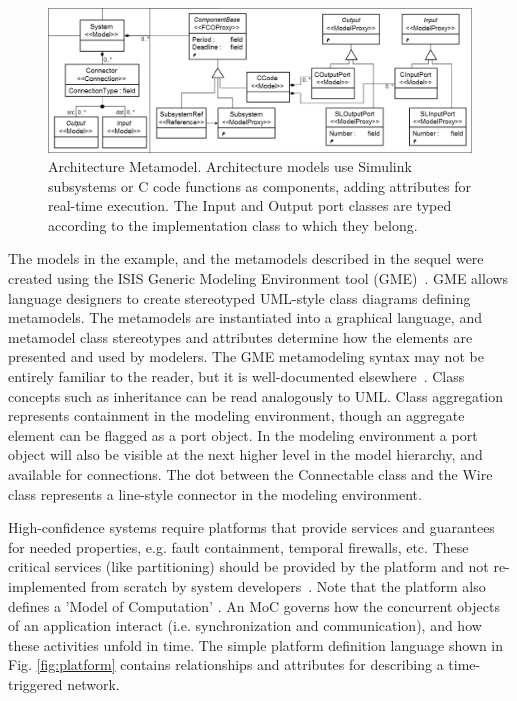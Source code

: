 \begin{figure}
	\centering
	\includegraphics[width=0.9\columnwidth]{diagrams/arch_lang.png}
	\caption{Architecture Metamodel. Architecture models use Simulink subsystems or C code functions as components, adding attributes for real-time execution. The Input and Output port classes are typed according to the implementation class to which they belong.}
	\label{fig:arch}
\end{figure}

The models in the example, and the metamodels described in the sequel were created using the ISIS Generic Modeling Environment tool (GME)~\cite{isis:gme}.  GME allows language designers to create stereotyped UML-style class diagrams defining metamodels.  The metamodels are instantiated into a graphical language, and metamodel class stereotypes and attributes determine how the elements are presented and used by modelers.  The GME metamodeling syntax may not be entirely familiar to the reader, but it is well-documented elsewhere~\cite{karsai:mic}. Class concepts such as inheritance can be read analogously to UML.  Class aggregation represents containment in the modeling environment, though an aggregate element can be flagged as a port object.  In the modeling environment a port object will also be visible at the next higher level in the model hierarchy, and available for connections.  The dot between the Connectable class and the Wire class represents a line-style connector in the modeling environment.

High-confidence systems require platforms that provide services and guarantees for needed properties, e.g. fault containment, temporal firewalls, etc. These critical services (like partitioning) should be provided by the platform and not re-implemented from scratch by system developers~\cite{alberto:2002}.  Note that the platform also defines a 'Model of Computation' \cite{Lee:M97/11}. An MoC governs how the concurrent objects of an application interact (i.e. synchronization and communication), and how these activities unfold in time. The simple platform definition language shown in Fig. \ref{fig:platform} contains relationships and attributes for describing a time-triggered network. 

